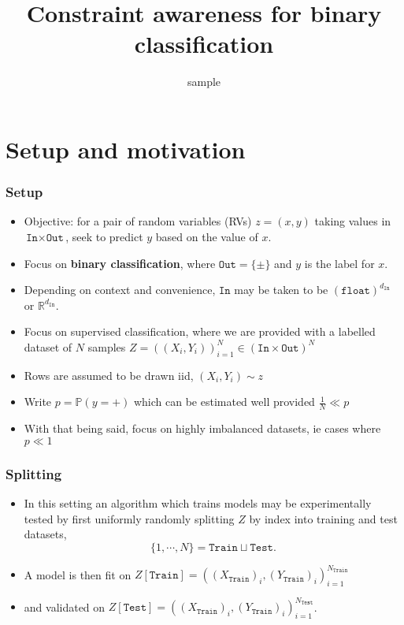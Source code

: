 \documentclass{beamer}
\title{Constraint awareness for binary classification}
\subtitle{sample}
\newcommand{\IN}{{\texttt{In}}}
\newcommand{\OUT}{{\texttt{Out}}}
\newcommand{\TWO}{\{\pm\}}
\newcommand{\TRN}{{\texttt{Train}}}
\newcommand{\TST}{{\texttt{Test}}}
\begin{document}
\begin{frame}
\titlepage
\end{frame}

\section{Setup and motivation}
\begin{frame}
\frametitle{Setup}
\begin{itemize}
\item
  Objective: for a pair of random variables (RVs) $z=(x,y)$ taking values in $\IN\times\OUT$, seek to predict $y$ based on the value of $x$.
\item
  Focus on \textbf{binary classification}, where $\OUT=\TWO$ and $y$ is the label for $x$.
\item
  Depending on context and convenience, $\IN$ may be taken to be $\left(\texttt{float}\right)^{d_\IN}$ or $\mathbb R^{d_\IN}$.
\item
Focus on supervised classification, where we are provided with a labelled dataset of $N$ samples $Z=\left((X_i,Y_i)\right)_{i=1}^N\in\left(\IN\times\OUT\right)^N$
\item
Rows are assumed to be drawn iid, $(X_i,Y_i)\sim z$
\item
Write $p=\mathbb P(y=+)$ which can be estimated well provided $\tfrac1N\ll p$
\item
With that being said, focus on highly imbalanced datasets, ie cases where $p\ll1$
\end{itemize}
\end{frame}
\begin{frame}
\frametitle{Splitting}
\begin{itemize}
\item
In this setting an algorithm which trains models may be experimentally tested by first uniformly randomly splitting $Z$ by index into training and test datasets,
$$
\{1,\cdots,N\}=\TRN\sqcup\TST.
$$
\item
A model is then fit on $Z[\TRN]=\left((X_\TRN)_i,(Y_\TRN)_i\right)_{i=1}^{N_\TRN}$
\item
and validated on $Z[\TST]=\left((X_\TRN)_i,(Y_\TRN)_i\right)_{i=1}^{N_\TST}$.
\end{itemize}
\end{frame}
\end{document}
